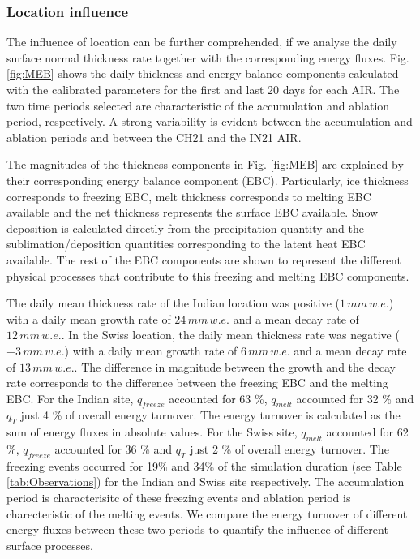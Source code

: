 \documentclass[utf8]{frontiersSCNS}
\begin{document}
\subsubsection{Location influence}

The influence of location can be further comprehended, if we analyse the daily surface normal thickness rate
together with the corresponding energy fluxes. Fig.  \ref{fig:MEB} shows the daily thickness and energy balance
components calculated with the calibrated parameters for the first and last 20 days for each AIR. The two time
periods selected are characteristic of the accumulation and ablation period, respectively. A strong variability is
evident between the accumulation and ablation periods and between the CH21 and the IN21 AIR.

The magnitudes of the thickness components in Fig. \ref{fig:MEB} are explained by their corresponding
energy balance component (EBC).  Particularly, ice thickness corresponds to freezing EBC, melt thickness
corresponds to melting EBC available and the net thickness represents the surface EBC available.  Snow
deposition is calculated directly from the precipitation quantity and the sublimation/deposition quantities
corresponding to the latent heat EBC available.  The rest of the EBC components are shown to represent the
different physical processes that contribute to this freezing and melting EBC components.

The daily mean thickness rate of the Indian location was positive ($1\, mm \,w.e.$) with a daily mean growth
rate of $24\, mm \,w.e.$ and a mean decay rate of $12\, mm \,w.e.$. In the Swiss location, the daily mean
thickness rate was negative ($-3\, mm \,w.e.$) with a daily mean growth rate of $6\, mm \,w.e.$ and a mean decay
rate of $13\, mm \,w.e.$. The difference in magnitude between the growth and the decay rate corresponds to the
difference between the freezing EBC and the melting EBC. For the Indian site, $q_{freeze}$ accounted for 63 \%,
$q_{melt}$ accounted for 32 \% and $q_{T}$ just 4 \% of overall energy turnover. The energy turnover is calculated
as the sum of energy fluxes in absolute values. For the Swiss site, $q_{melt}$ accounted for 62 \%, $q_{freeze}$
accounted for 36 \% and $q_{T}$ just 2 \% of overall energy turnover. The freezing events occurred for 19\% and
34\% of the simulation duration (see Table \ref{tab:Observations}) for the Indian and Swiss site respectively.
The accumulation period is characterisitc of these freezing events and ablation period is charecteristic of the
melting events. We compare the energy turnover of different energy fluxes between these two periods to quantify
the influence of different surface processes.
\end{document}
